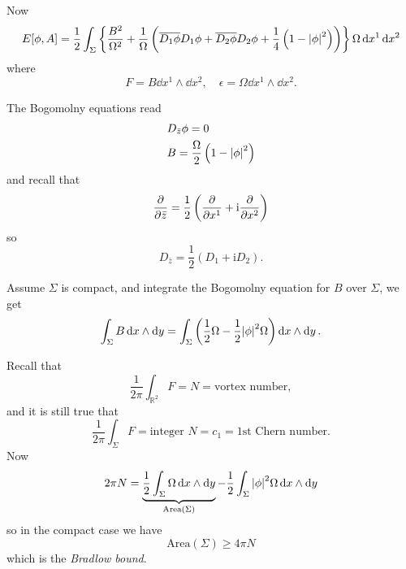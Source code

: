\documentclass[a4paper,11pt]{article}
\begin{document}
    Now 
    \begin{equation}
        E[\phi, A] = \frac{1}{2} \int_\Sigma \left\{ \frac{B^2}{\Omega^2} + \frac{1}{\Omega} \left( \overline{D_1 \phi} D_1 \phi + \overline{D_2 \phi} D_2 \phi + \frac{1}{4}\left( 1 - \abs{\phi}^2 \right)\right) \right\} \Omega \dd{x^1} \dd{x^2}
    \end{equation}
    where 
    \begin{equation}
        F = B \dd{x^1} \wedge \dd{x^2}, \quad \epsilon = \Omega \dd{x^1} \wedge \dd{x^2}.
    \end{equation}

    The Bogomolny equations read 
    \begin{align}
        & D_{\bar z} \phi = 0\\
        & B = \frac{\Omega}{2} \left( 1 - \abs{\phi}^2 \right)
    \end{align}
    and recall that 
    \begin{equation}
        \pdv{\bar z} = \frac{1}{2}\left( \pdv{x^1} + \mathrm{i} \pdv{x^2} \right)
    \end{equation}
    so 
    \begin{equation}
        D_{\bar z} = \frac{1}{2} \left( D_1 + \mathrm{i} D_2 \right).
    \end{equation}


    Assume $\Sigma$ is compact, and integrate the Bogomolny equation for $B$ over $\Sigma$, we get
    \begin{equation}
        \int_\Sigma B \dd{x} \wedge \dd{y} = \int_\Sigma \left( \frac{1}{2} \Omega - \frac{1}{2} \abs{\phi}^2 \Omega \right) \dd{x} \wedge \dd{y}.
    \end{equation}

    Recall that 
    \begin{equation}
        \frac{1}{2 \pi} \int_{\mathbb{R}^2} F = N = \text{vortex number},
    \end{equation}
    and it is still true that 
    \begin{equation}
        \frac{1}{2 \pi} \int_\Sigma F = \text{integer }N = c_1 = \text{1st Chern number}.
    \end{equation}
    Now 
    \begin{equation}
        2 \pi N = \underbrace{\frac{1}{2} \int_\Sigma \Omega \dd{x} \wedge \dd{y}}_{\text{Area}(\Sigma)} - \frac{1}{2} \int_\Sigma \abs{\phi}^2 \Omega \dd{x} \wedge \dd{y}
    \end{equation}
    so in the compact case we have 
    \begin{equation}
        \boxed{\text{Area}(\Sigma) \geq 4 \pi N}
    \end{equation}
    which is the \emph{Bradlow bound}.
\end{document}
